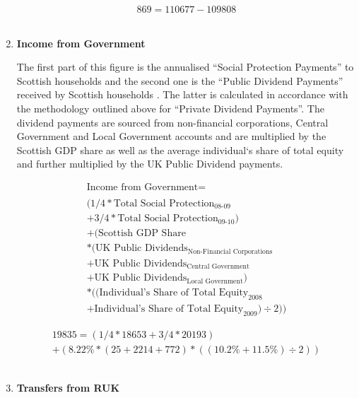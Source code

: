 \begin{enumerate}
\begin{equation} \nonumber
869 = 110677-109808
\end{equation}\\

\item \textbf {Income from Government}

The first part of this figure is the annualised ``Social Protection Payments'' to Scottish households \cite{ScotGov2013b} and the second one is the ``Public Dividend Payments'' received by Scottish households \cite{ONS2011c}. The latter is calculated in accordance with the methodology outlined above for ``Private Dividend Payments''. The dividend payments are sourced from non-financial corporations, Central Government and Local Government accounts and are multiplied by the Scottish GDP share as well as the average individual`s share of total equity and further multiplied by the UK Public Dividend payments.  

\begin{equation}
\begin{split}
\text{Income from Government} =  \\ \\
(1/4*\text{Total Social Protection}_\text{08-09}\\
+3/4*\text{Total Social Protection}_\text{09-10})\\
+(\text{Scottish GDP Share} \\
*(\text{UK Public Dividends}_\text{Non-Financial Corporations}\\
+\text{UK Public Dividends}_\text{Central Government}\\
+\text{UK Public Dividends}_\text{Local Government})\\
*((\text{Individual's Share of Total Equity}_\text{2008}\\
+\text{Individual's Share of Total Equity}_\text{2009})\div 2))
\end{split} \label{eq:2.5.8}
\end{equation}


\begin{equation} \nonumber
\begin{split}
19835 = (1/4*18653+3/4*20193)\\
+(8.22\%*(25+2214+772)*((10.2\%+11.5\%)\div 2))
\end{split}
\end{equation}\\


\item \textbf {Transfers from RUK}


\end{enumerate}
